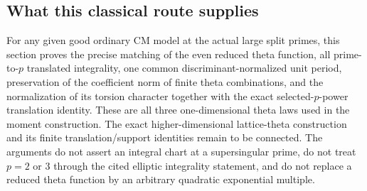 \subsection{What this classical route supplies}

For any given good ordinary CM model at the actual large split
primes, this section proves the precise matching of the even
reduced theta function, all prime-to-$p$ translated integrality,
one common discriminant-normalized unit period, preservation of
the coefficient norm of finite theta combinations, and the
normalization of its torsion character together with the exact
selected-$p$-power translation identity.  These are all three
one-dimensional theta laws used in the moment construction.
The exact higher-dimensional
lattice-theta construction and its finite translation/support
identities remain to be connected.  The arguments do not assert
an integral chart at a supersingular prime, do not treat $p=2$
or $3$ through the cited elliptic integrality statement, and do
not replace a reduced theta function by an arbitrary quadratic
exponential multiple.


